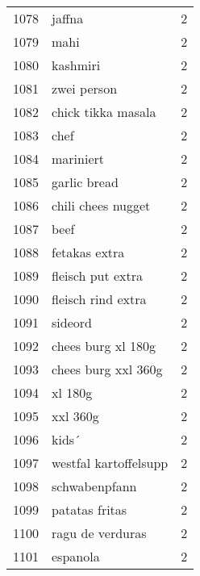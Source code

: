 \begin{tabular}{llr}
1078 &                                             jaffna &      2 \\
1079 &                                               mahi &      2 \\
1080 &                                           kashmiri &      2 \\
1081 &                                        zwei person &      2 \\
1082 &                                 chick tikka masala &      2 \\
1083 &                                               chef &      2 \\
1084 &                                          mariniert &      2 \\
1085 &                                       garlic bread &      2 \\
1086 &                                 chili chees nugget &      2 \\
1087 &                                               beef &      2 \\
1088 &                                      fetakas extra &      2 \\
1089 &                                  fleisch put extra &      2 \\
1090 &                                 fleisch rind extra &      2 \\
1091 &                                            sideord &      2 \\
1092 &                                 chees burg xl 180g &      2 \\
1093 &                                chees burg xxl 360g &      2 \\
1094 &                                            xl 180g &      2 \\
1095 &                                           xxl 360g &      2 \\
1096 &                                              kids´ &      2 \\
1097 &                              westfal kartoffelsupp &      2 \\
1098 &                                      schwabenpfann &      2 \\
1099 &                                     patatas fritas &      2 \\
1100 &                                   ragu de verduras &      2 \\
1101 &                                           espanola &      2 \\

\end{tabular}
